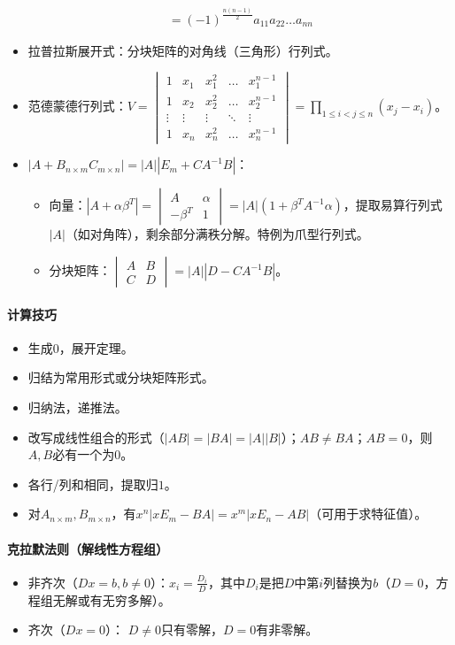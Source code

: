 \documentclass[
12pt, %
a4paper, 
oneside, %
headinclude,footinclude, %
]{scrartcl}
\begin{document}
\begin{itemize}
{\begin{align*}
= (-1)^{\frac{n(n - 1)}{2}} a_{1 1} a_{2 2} \dots a_{n n}
\end{align*}
}
\item 拉普拉斯展开式：分块矩阵的对角线（三角形）行列式。
\item 范德蒙德行列式：$ V = \begin{vmatrix} 1 & x_1 & x_1^2 & \dots & x_1^{n - 1} \\ 1 & x_2 & x_2^2 & \dots & x_2^{n - 1} \\ \vdots & \vdots & \vdots & \ddots & \vdots \\ 1 & x_n & x_n^2 & \dots & x_n^{n - 1} \end{vmatrix} = \prod_{1 \leq i < j \leq n} (x_j - x_i) $。
\item $ |A + B_{n \times m}C_{m \times n}| = |A||E_m + CA^{-1}B| $：
\begin{itemize}
\item 向量：$ |A + \alpha\beta^T| = \begin{vmatrix} A & \alpha \\ -\beta^T & 1 \end{vmatrix} = |A|(1 + \beta^TA^{-1}\alpha) $，提取易算行列式$ |A| $（如对角阵），剩余部分满秩分解。特例为爪型行列式。
\item 分块矩阵：$ \begin{vmatrix} A & B \\ C & D \end{vmatrix} = |A||D - CA^{-1}B| $。
\end{itemize}
\end{itemize}
\paragraph{计算技巧}
\begin{itemize}
\item 生成$ 0 $，展开定理。
\item 归结为常用形式或分块矩阵形式。
\item 归纳法，递推法。
\item 改写成线性组合的形式（$ |AB| = |BA| = |A||B| $）；$ AB \neq BA $；$ AB = 0 $，则$ A,B $必有一个为$ 0 $。
\item 各行/列和相同，提取归$ 1 $。
\item 对$ A_{n \times m},B_{m \times n} $，有$ x^n|xE_m - BA| = x^m|xE_n - AB| $（可用于求特征值）。
\end{itemize}
\paragraph{克拉默法则（解线性方程组）}
\begin{itemize}
\item 非齐次（$ Dx = b, b \neq 0 $）：$ x_i = \frac{D_i}{D} $，其中$ D_i $是把$ D $中第$ i $列替换为$ b $（$ D = 0 $，方程组无解或有无穷多解）。
\item 齐次（$ Dx = 0 $）： $ D \neq 0 $只有零解，$ D = 0 $有非零解。
\end{itemize}
\end{document}
